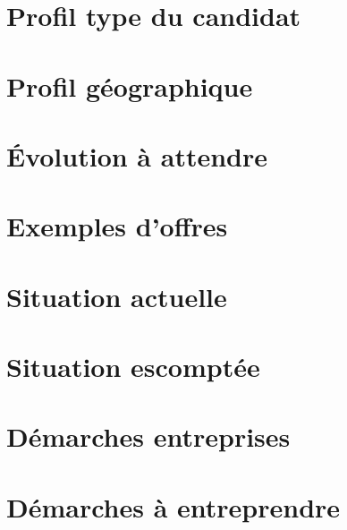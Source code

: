 \documentclass[12pt, a4paper]{report} %
\begin{document}
\section{Profil type du candidat}

\section{Profil géographique}
\section{Évolution à attendre}
\section{Exemples d'offres}

\section{Situation actuelle}
\section{Situation escomptée}

\section{Démarches entreprises}
\section{Démarches à entreprendre}





\newpage
{}


\renewcommand{\bibname}{Sitographie}

\tableofcontents %
\begin{abstract} %
\end{abstract}

\printglossaries
\label{glos}
\end{document}
